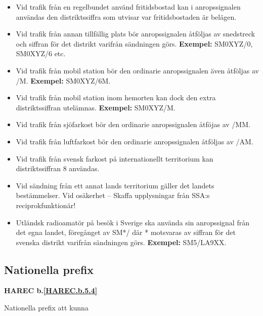 \begin{itemize}

\item Vid trafik från en regelbundet använd fritidsbostad kan i
  anropssignalen användas den distriktssiffra som utvisar var
  fritidsbostaden är belägen.

\item Vid trafik från annan tillfällig plats bör anropssignalen
  åtföljas av snedstreck och siffran för det distrikt varifrån
  sändningen görs. \textbf{Exempel:} SM0XYZ/0, SM0XYZ/6 etc.

\item Vid trafik från mobil station bör den ordinarie anropssignalen
  även åtföljas av /M.  \textbf{Exempel:} SM0XYZ/6M.

\item Vid trafik från mobil station inom hemorten kan dock den extra
  distriktssiffran utelämnas.  \textbf{Exempel:} SM0XYZ/M.

\item Vid trafik från sjöfarkost bör den ordinarie anropssignalen
 åtföjas av /MM.

\item Vid trafik från luftfarkost bör den ordinarie anropssignalen
  åtföljas av /AM.

\item Vid trafik från svensk farkost på internationellt territorium
 kan distriktssiffran 8 användas.

\item Vid sändning från ett annat lands territorium gäller det landets
  bestämmelser. Vid osäkerhet -- Skaffa upplysningar från SSA:s
  reciprokfunktionär!

\item Utländsk radioamatör på besök i Sverige ska använda sin
  anropssignal från det egna landet, föregånget av SM*/ där *
  motsvaras av siffran för det svenska distrikt varifrån sändningen
  görs. \textbf{Exempel:} SM5/LA9XX.
\end{itemize}

\subsection{Nationella prefix}
\textbf{HAREC 
	b.\ref{HAREC.b.5.4}\label{myHAREC.b.5.4}
}

Nationella prefix att kunna

